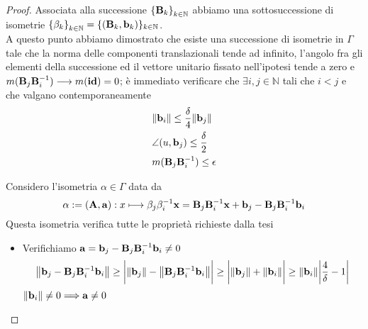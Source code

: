 \documentclass[a4paper,11pt,openright,twoside	]{book}
\begin{document}
\begin{proof}
Associata alla successione ${ \{\vb{B}_k \} }_{k \in \mathbb{N}}$ abbiamo una sottosuccessione di isometrie ${ \{\beta_k \}}_{k \in \mathbb{N}} = \{ (\vb{B}_k , \vb{b}_k ) \}_{k \in \mathbb{N}}$. \\
A questo punto abbiamo dimostrato che esiste una successione di isometrie in $\Gamma$ tale che la norma delle componenti translazionali tende ad infinito, l'angolo fra gli elementi della successione ed il vettore unitario fissato nell'ipotesi tende a zero e $m(\vb{B}_j \vb{B}^{-1}_i) \longrightarrow m(\vb{id}) = 0 $; è immediato verificare che $\exists i,j \in \mathbb{N} $  tali che  $ i < j$  e che valgano contemporaneamente
\begin{equation}
\label{eq:bib1}
\begin{split}
& \norm{\vb{b}_i} \leq \frac{\delta}{4}\norm{\vb{b}_j} \\
& \angle(u, \vb{b}_j ) \leq \frac{\delta}{2} \\
& m( \vb{B}_j \vb{B}^{-1}_i ) \leq \epsilon  
\end{split}
\end{equation}


Considero l'isometria $\alpha \in \Gamma$ data da 
\[ \alpha := (\vb{A, a})  : x \longmapsto \beta_j \beta^{-1}_i \vb{x} = \vb{B}_j \vb{B}^{-1}_i \vb{x} + \vb{b}_j - \vb{B}_j \vb{B}^{-1}_i \vb{b}_i\]
Questa isometria verifica tutte le proprietà richieste dalla tesi

\begin{itemize}
\item Verifichiamo  $\vb{a}= \vb{b}_j - \vb{B}_j \vb{B}^{-1}_i \vb{b}_i \neq 0$ 
\[ \norm{\vb{b}_j - \vb{B}_j \vb{B}^{-1}_i \vb{b}_i} \geq \bigg| \norm{\vb{b}_j} - \norm{ \vb{B}_j \vb{B}^{-1}_i \vb{b}_i } \bigg| \geq \bigg| \norm{\vb{b}_j } + \norm{\vb{b}_i} \bigg| \geq \norm{\vb{b}_i} \bigg| \frac{4}{\delta} -1 \bigg| \]
$\norm{\vb{b}_i} \neq 0 \Longrightarrow \vb{a} \neq 0$
 

\end{itemize}
\end{proof}
\end{document}
